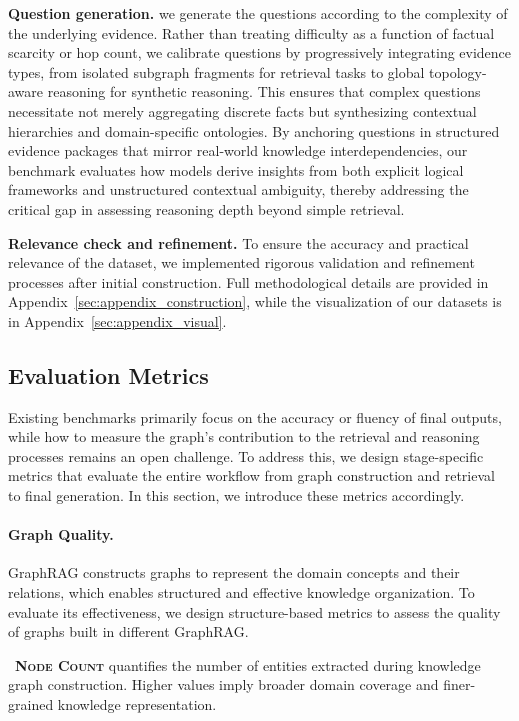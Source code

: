 \documentclass{article} %
\begin{document}
\noindent \textbf{Question generation.} we generate the questions according to the complexity of the underlying evidence. Rather than treating difficulty as a function of factual scarcity or hop count, we calibrate questions by progressively integrating evidence types, from isolated subgraph fragments for retrieval tasks to global topology-aware reasoning for synthetic reasoning. This ensures that complex questions necessitate not merely aggregating discrete facts but synthesizing contextual hierarchies and domain-specific ontologies. By anchoring questions in structured evidence packages that mirror real-world knowledge interdependencies, our benchmark evaluates how models derive insights from both explicit logical frameworks and unstructured contextual ambiguity, thereby addressing the critical gap in assessing reasoning depth beyond simple retrieval. 

\noindent \textbf{Relevance check and refinement.} To ensure the accuracy and practical relevance of the dataset, we implemented rigorous validation and refinement processes after initial construction.  Full methodological details are provided in Appendix~\ref{sec:appendix_construction}, while the visualization of our datasets is in Appendix~\ref{sec:appendix_visual}.

\subsection{Evaluation Metrics}
Existing benchmarks primarily focus on the accuracy or fluency of final outputs, while how to measure the graph’s contribution to the retrieval and reasoning processes remains an open challenge.
To address this, we design stage-specific metrics that evaluate the entire workflow from graph construction and retrieval to final generation. In this section, we introduce these metrics accordingly.

\paragraph{Graph Quality.}
GraphRAG constructs graphs to represent the domain concepts and their relations, which enables structured and effective knowledge organization. To evaluate its effectiveness, we design structure-based metrics to assess the quality of graphs built in different GraphRAG.

\noindent\textbullet\ \textbf{\textsc{Node Count}} quantifies the number of entities extracted during knowledge graph construction. Higher values imply broader domain coverage and finer-grained knowledge representation.
\end{document}
